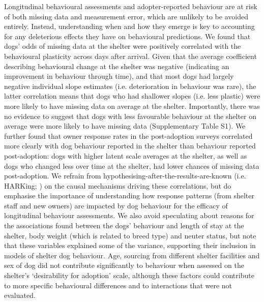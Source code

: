\documentclass[12pt]{article}
\begin{document}
Longitudinal behavioural assessments and adopter-reported behaviour are at risk of both missing data and measurement error, which are unlikely to be avoided entirely. Instead, understanding when and how they emerge is key to accounting for any deleterious effects they have on behavioural predictions. We found that dogs' odds of missing data at the shelter were positively correlated with the behavioural plasticity across days after arrival. Given that the average coefficient describing behavioural change at the shelter was negative (indicating an improvement in behaviour through time), and that most dogs had largely negative individual slope estimates (i.e. deterioration in behaviour was rare), the latter correlation means that dogs who had shallower slopes (i.e. less plastic) were more likely to have missing data on average at the shelter. Importantly, there was no evidence to suggest that dogs with less favourable behaviour at the shelter on average were more likely to have missing data (Supplementary Table S1). We further found that owner response rates in the post-adoption surveys correlated more clearly with dog behaviour reported in the shelter than behaviour reported post-adoption: dogs with higher latent scale averages at the shelter, as well as dogs who changed less over time at the shelter, had lower chances of missing data post-adoption. We refrain from hypothesising-after-the-results-are-known (i.e. HARKing; \cite{kerr1998}) on the causal mechanisms driving these correlations, but do emphasise the importance of understanding how response patterns (from shelter staff and new owners) are impacted by dog behaviour for the efficacy of longitudinal behaviour assessments. We also avoid speculating about reasons for the associations found between the dogs' behaviour and length of stay at the shelter, body weight (which is related to breed type) and neuter status, but note that these variables explained some of the variance, supporting their inclusion in models of shelter dog behaviour. Age, sourcing from different shelter facilities and sex of dog did not contribute significantly to behaviour when assessed on the shelter's `desirability for adoption' scale, although these factors could contribute to more specific behavioural differences and to interactions that were not evaluated.
\end{document}
